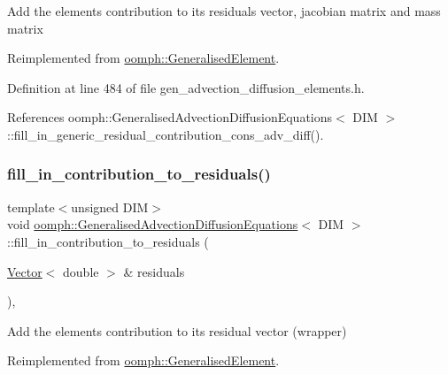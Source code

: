 Add the element\textquotesingle{}s contribution to its residuals vector, jacobian matrix and mass matrix 

Reimplemented from \hyperlink{classoomph_1_1GeneralisedElement_a2b6294a730647cf865da94f2531466f8}{oomph\+::\+Generalised\+Element}.



Definition at line 484 of file gen\+\_\+advection\+\_\+diffusion\+\_\+elements.\+h.



References oomph\+::\+Generalised\+Advection\+Diffusion\+Equations$<$ D\+I\+M $>$\+::fill\+\_\+in\+\_\+generic\+\_\+residual\+\_\+contribution\+\_\+cons\+\_\+adv\+\_\+diff().

\mbox{\label{classoomph_1_1GeneralisedAdvectionDiffusionEquations_a322c49659ad14f656165f7e777d3368a}} 
\subsubsection{\texorpdfstring{fill\+\_\+in\+\_\+contribution\+\_\+to\+\_\+residuals()}{fill\_in\_contribution\_to\_residuals()}}
{\footnotesize\ttfamily template$<$unsigned D\+IM$>$ \\
void \hyperlink{classoomph_1_1GeneralisedAdvectionDiffusionEquations}{oomph\+::\+Generalised\+Advection\+Diffusion\+Equations}$<$ D\+IM $>$\+::fill\+\_\+in\+\_\+contribution\+\_\+to\+\_\+residuals (\begin{DoxyParamCaption}\item[{\hyperlink{classoomph_1_1Vector}{Vector}$<$ double $>$ \&}]{residuals }\end{DoxyParamCaption})\hspace{0.3cm}{\ttfamily [inline]}, {\ttfamily [virtual]}}



Add the element\textquotesingle{}s contribution to its residual vector (wrapper) 



Reimplemented from \hyperlink{classoomph_1_1GeneralisedElement_a310c97f515e8504a48179c0e72c550d7}{oomph\+::\+Generalised\+Element}.



